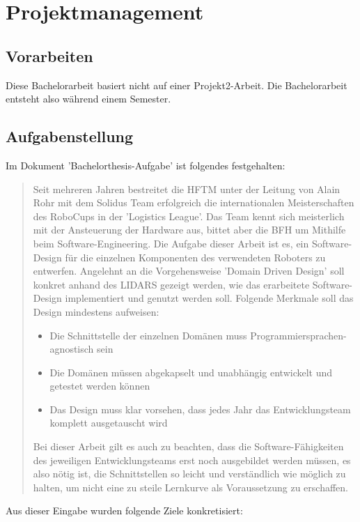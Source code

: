 \chapter{Projektmanagement}
\section{Vorarbeiten}
Diese Bachelorarbeit basiert nicht auf einer Projekt2-Arbeit. Die Bachelorarbeit entsteht also während einem Semester.
\section{Aufgabenstellung}
\label{chap:aufgabenstellung}
Im Dokument 'Bachelorthesis-Aufgabe' ist folgendes festgehalten:
\begin{quote}
	Seit mehreren Jahren bestreitet die HFTM unter der Leitung von Alain Rohr mit dem Solidus Team erfolgreich die internationalen Meisterschaften des RoboCups in der 'Logistics League'.
	Das Team kennt sich meisterlich mit der Ansteuerung der Hardware aus, bittet aber die BFH um Mithilfe beim Software-Engineering.
	Die Aufgabe dieser Arbeit ist es, ein Software-Design für die einzelnen Komponenten des verwendeten Roboters zu entwerfen. Angelehnt an die Vorgehensweise 'Domain Driven Design' soll konkret anhand des LIDARS gezeigt werden, wie das erarbeitete Software-Design implementiert und genutzt werden soll. Folgende Merkmale soll das Design mindestens aufweisen:
	
	\begin{itemize}
		\item Die Schnittstelle der einzelnen Domänen muss Programmiersprachen-agnostisch sein
		\item Die Domänen müssen abgekapselt und unabhängig entwickelt und getestet werden können
		\item Das Design muss klar vorsehen, dass jedes Jahr das Entwicklungsteam komplett ausgetauscht wird
	\end{itemize}
	Bei dieser Arbeit gilt es auch zu beachten, dass die Software-Fähigkeiten des jeweiligen Entwicklungsteams erst noch ausgebildet werden müssen, es also nötig ist, die Schnittstellen so leicht und verständlich wie möglich zu halten, um nicht eine zu steile Lernkurve als Voraussetzung zu erschaffen.
\end{quote}

Aus dieser Eingabe wurden folgende Ziele konkretisiert:
